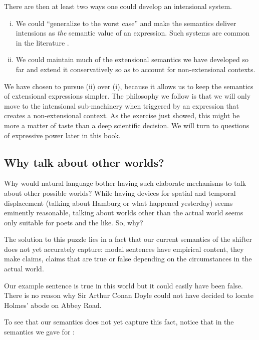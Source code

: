 \noindent There are then at least two ways one could develop an
intensional system.
\begin{enumerate}
	[(i)] 
\item We could ``generalize to the worst case'' and make the semantics deliver
  intensions as \emph{the} semantic value of an expression. Such systems are
  common in the literature
  \citep[see][]{lewis-1970-general-semantics,cresswell-1973-logics}.
\item We could maintain much of the extensional semantics we have developed so
  far and extend it conservatively so as to account for non-extensional
  contexts.
	
\end{enumerate}
%
We have chosen to pursue (ii) over (i), because it allows us to keep the
semantics of extensional expressions simpler. The philosophy we follow is that
we will only move to the intensional sub-machinery when triggered by an
expression that creates a non-extensional context. As the exercise just showed,
this might be more a matter of taste than a deep scientific decision. We will
turn to questions of expressive power later in this book.

\subsection{Why talk about other worlds?} \label{sec:why-talk-about}

Why would natural language bother having such elaborate mechanisms to talk about
other possible worlds? While having devices for spatial and temporal
displacement (talking about Hamburg or what happened yesterday) seems eminently
reasonable, talking about worlds other than the actual world seems only suitable
for poets and the like. So, why?

The solution to this puzzle lies in a fact that our current semantics of the
shifter  does not yet accurately
capture: modal sentences have empirical content, they make 
claims, claims that are true or false depending on the circumstances in the
actual world.

Our example sentence  is true in this world but it could
easily have been false. There is no reason why Sir Arthur Conan Doyle could not
have decided to locate Holmes' abode on Abbey Road.

To see that our semantics does not yet capture this fact, notice that in the
semantics we gave for :

